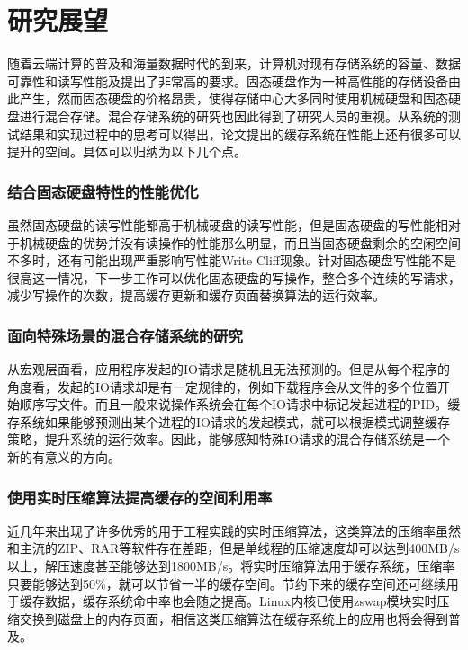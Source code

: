 \section{研究展望}
\label{sec:thesis_expectation}
随着云端计算的普及和海量数据时代的到来，计算机对现有存储系统的容量、数据可靠性和读写性能及提出了非常高的要求。固态硬盘作为一种高性能的存储设备由此产生，然而固态硬盘的价格昂贵，使得存储中心大多同时使用机械硬盘和固态硬盘进行混合存储。混合存储系统的研究也因此得到了研究人员的重视。从系统的测试结果和实现过程中的思考可以得出，论文提出的缓存系统在性能上还有很多可以提升的空间。具体可以归纳为以下几个点。


\subsubsection{结合固态硬盘特性的性能优化}

虽然固态硬盘的读写性能都高于机械硬盘的读写性能，但是固态硬盘的写性能相对于机械硬盘的优势并没有读操作的性能那么明显，而且当固态硬盘剩余的空闲空间不多时，还有可能出现严重影响写性能Write Cliff现象。针对固态硬盘写性能不是很高这一情况，下一步工作可以优化固态硬盘的写操作，整合多个连续的写请求，减少写操作的次数，提高缓存更新和缓存页面替换算法的运行效率。

\subsubsection{面向特殊场景的混合存储系统的研究}

从宏观层面看，应用程序发起的IO请求是随机且无法预测的。但是从每个程序的角度看，发起的IO请求却是有一定规律的，例如下载程序会从文件的多个位置开始顺序写文件。而且一般来说操作系统会在每个IO请求中标记发起进程的PID。缓存系统如果能够预测出某个进程的IO请求的发起模式，就可以根据模式调整缓存策略，提升系统的运行效率。因此，能够感知特殊IO请求的混合存储系统是一个新的有意义的方向。

\subsubsection{使用实时压缩算法提高缓存的空间利用率}

近几年来出现了许多优秀的用于工程实践的实时压缩算法，这类算法的压缩率虽然和主流的ZIP、RAR等软件存在差距，但是单线程的压缩速度却可以达到400MB/s以上，解压速度甚至能够达到1800MB/s。将实时压缩算法用于缓存系统，压缩率只要能够达到50\%，就可以节省一半的缓存空间。节约下来的缓存空间还可继续用于缓存数据，缓存系统命中率也会随之提高。Linux内核已使用zswap模块实时压缩交换到磁盘上的内存页面，相信这类压缩算法在缓存系统上的应用也将会得到普及。


